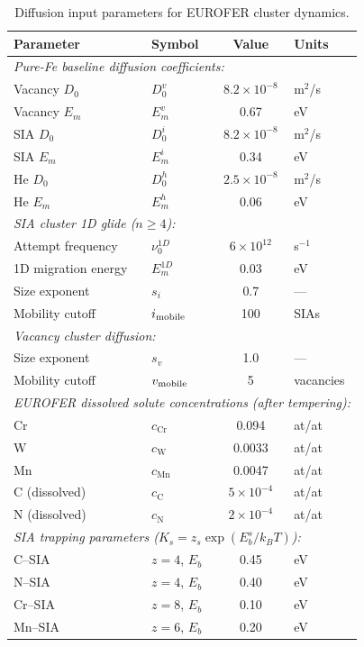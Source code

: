 \documentclass[pdflatex,sn-basic]{sn-jnl} %
\begin{document}
\begin{table}[htbp]
\centering
\caption{Diffusion input parameters for EUROFER cluster dynamics.}
\label{tab:diff_params}
\renewcommand{\arraystretch}{1.15}
\begin{tabular}{@{}llcl@{}}
\toprule
\textbf{Parameter} & \textbf{Symbol} & \textbf{Value} & \textbf{Units} \\
\midrule
\multicolumn{4}{l}{\emph{Pure-Fe baseline diffusion coefficients:}} \\
Vacancy $D_0$ & $D_0^v$ & $8.2\times10^{-8}$ & m$^2$/s \\
Vacancy $E_m$ & $E_m^v$ & 0.67 & eV \\
SIA $D_0$ & $D_0^i$ & $8.2\times10^{-8}$ & m$^2$/s \\
SIA $E_m$ & $E_m^i$ & 0.34 & eV \\
He $D_0$ & $D_0^h$ & $2.5\times10^{-8}$ & m$^2$/s \\
He $E_m$ & $E_m^h$ & 0.06 & eV \\[4pt]

\multicolumn{4}{l}{\emph{SIA cluster 1D glide ($n \geq 4$):}} \\
Attempt frequency & $\nu_0^{1D}$ & $6\times10^{12}$ & s$^{-1}$ \\
1D migration energy & $E_m^{1D}$ & 0.03 & eV \\
Size exponent & $s_i$ & 0.7 & --- \\
Mobility cutoff & $i_{\rm mobile}$ & 100 & SIAs \\[4pt]

\multicolumn{4}{l}{\emph{Vacancy cluster diffusion:}} \\
Size exponent & $s_v$ & 1.0 & --- \\
Mobility cutoff & $v_{\rm mobile}$ & 5 & vacancies \\[4pt]

\multicolumn{4}{l}{\emph{EUROFER dissolved solute concentrations (after tempering):}} \\
Cr & $c_{\mathrm{Cr}}$ & 0.094 & at/at \\
W & $c_{\mathrm{W}}$ & 0.0033 & at/at \\
Mn & $c_{\mathrm{Mn}}$ & 0.0047 & at/at \\
C (dissolved) & $c_{\mathrm{C}}$ & $5\times10^{-4}$ & at/at \\
N (dissolved) & $c_{\mathrm{N}}$ & $2\times10^{-4}$ & at/at \\[4pt]

\multicolumn{4}{l}{\emph{SIA trapping parameters ($K_s = z_s\exp(E_b^s/k_BT)$):}} \\
C--SIA & $z=4$, $E_b$ & 0.45 & eV \\
N--SIA & $z=4$, $E_b$ & 0.40 & eV \\
Cr--SIA & $z=8$, $E_b$ & 0.10 & eV \\
Mn--SIA & $z=6$, $E_b$ & 0.20 & eV \\[4pt]


\end{tabular}
\end{table}
\end{document}
